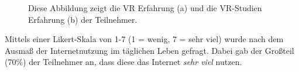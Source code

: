 \documentclass[a4paper,11pt]{article}%
\renewcommand{\\}{\vspace*{0.5\baselineskip} \newline}
\begin{document}
{\begin{figure}[h]
  \centering
  \qquad
  \caption[Die vorhandene VR-Erfahrung der Teilnehmer]{Diese Abbildung zeigt die VR Erfahrung (a) und die VR-Studien Erfahrung (b) der Teilnehmer.}
  \label{teilnehmerVRErfahrungen}
\end{figure}

Mittels einer Likert-Skala von 1-7 (1 = wenig, 7 = sehr viel) wurde nach dem Ausmaß der Internetnutzung im täglichen Leben gefragt. Dabei gab der Großteil (70\%) der Teilnehmer an, dass diese das Internet \textit{sehr viel} nutzen.

}
\end{document}
